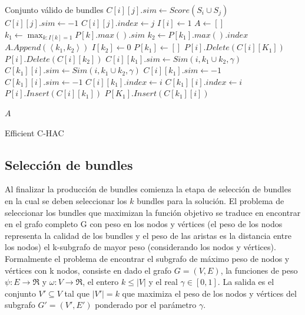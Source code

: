 \begin{algorithm}[H]
\begin{algorithmic}[1]
\ENSURE Conjunto válido de bundles
			\STATE $C[i][j].sim \leftarrow Score(S_i \cup S_j)$
		\ELSE
			\STATE $C[i][j].sim \leftarrow -1$
		\ENDIF
		\STATE $C[i][j].index \leftarrow j$
	\ENDFOR
	\STATE $I[i] \leftarrow 1$
\ENDFOR
\STATE $A \leftarrow []$
	\STATE $k_1 \leftarrow \max_{k:I[k]=1}{P[k].max().sim}$
		\BREAK
	\ENDIF
	\STATE $k_2 \leftarrow P[k_1].max().index$
	\STATE $A.Append(\left\langle k_1,k_2 \right\rangle)$
	\STATE $I[k_2] \leftarrow 0$
	\STATE $P[k_1] \leftarrow []$
		\STATE $P[i].Delete(C[i][K_1])$
		\STATE $P[i].Delete(C[i][k_2])$
			\STATE $C[i][k_1].sim \leftarrow Sim(i,k_1 \cup k_2,\gamma)$
			\STATE $C[k_1][i].sim \leftarrow Sim(i,k_1 \cup k_2,\gamma)$
		\ELSE
			\STATE $C[i][k_1].sim \leftarrow -1$
			\STATE $C[k_1][i].sim \leftarrow -1$
		\ENDIF
		\STATE $C[i][k_1].index \leftarrow i$
		\STATE $C[k_1][i].index \leftarrow i$		
		\STATE $P[i].Insert(C[i][k_1])$
		\STATE $P[K_1].Insert(C[k_1][i])$		
	\ENDFOR
\ENDFOR

\RETURN $A$
\end{algorithmic}
\caption{Efficient C-HAC}\label{alg:Efficient C-HAC}
\end{algorithm}

\subsection{Selección de bundles}
Al finalizar la producción de bundles comienza la etapa de selección de bundles en la cual se deben seleccionar los $k$ bundles para la solución. El problema de seleccionar los bundles que maximizan la función objetivo se traduce en encontrar en el grafo completo G con peso en los nodos y vértices (el peso de los nodos representa la calidad de los bundles y el peso de las aristas es la distancia entre los nodos) el k-subgrafo de mayor peso (considerando los nodos y vértices).\\
Formalmente el problema de encontrar el subgrafo de máximo peso de nodos y vértices con k nodos, consiste en dado el grafo $ G = (V,E) $, la funciones de peso $\psi : E \rightarrow \Re$ y $\omega : V \rightarrow \Re$, el entero $ k \leq |V| $ y el real $\gamma \in [0,1]$. La salida es el conjunto $V' \subseteq V$ tal que $|V'| = k$ que maximiza el peso de los nodos y vértices del subgrafo $G' = (V', E')$ ponderado por el parámetro $\gamma$.

